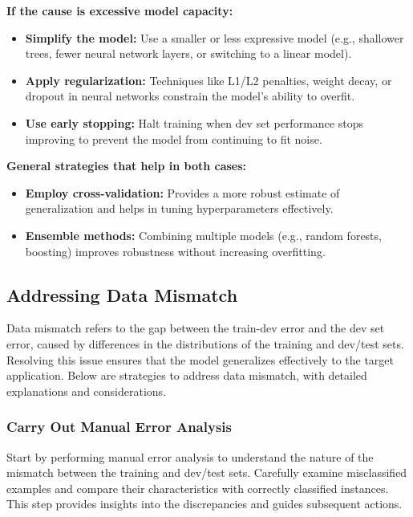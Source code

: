 \documentclass[12pt,openany]{book}
\begin{document}
\textbf{If the cause is excessive model capacity:}
\begin{itemize}
    \item \textbf{Simplify the model:} Use a smaller or less expressive model (e.g., shallower trees, fewer neural network layers, or switching to a linear model).
    \item \textbf{Apply regularization:} Techniques like L1/L2 penalties, weight decay, or dropout in neural networks constrain the model's ability to overfit.
    \item \textbf{Use early stopping:} Halt training when dev set performance stops improving to prevent the model from continuing to fit noise.
\end{itemize}

\textbf{General strategies that help in both cases:}
\begin{itemize}
    \item \textbf{Employ cross-validation:} Provides a more robust estimate of generalization and helps in tuning hyperparameters effectively.
    \item \textbf{Ensemble methods:} Combining multiple models (e.g., random forests, boosting) improves robustness without increasing overfitting.
\end{itemize}


\subsection{Addressing Data Mismatch}
\label{subsec:Adressing Data Mismatch}

Data mismatch refers to the gap between the train-dev error and the dev set error, caused by differences in the distributions of the training and dev/test sets. Resolving this issue ensures that the model generalizes effectively to the target application. Below are strategies to address data mismatch, with detailed explanations and considerations.

\subsubsection{Carry Out Manual Error Analysis}

Start by performing manual error analysis to understand the nature of the mismatch between the training and dev/test sets. Carefully examine misclassified examples and compare their characteristics with correctly classified instances. This step provides insights into the discrepancies and guides subsequent actions.
\end{document}
